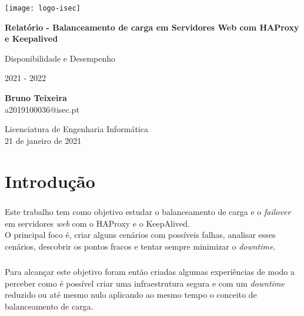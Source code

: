 \documentclass{report}
\begin{document}
	\begin{titlepage}
    	\begin{center}
    		\texttt{[image: logo-isec]}
    		
    		\vspace*{\fill}
    		
    		\Huge
    		\textbf{Relatório - Balanceamento de carga em Servidores Web com HAProxy e Keepalived}
    		
    		\huge
    		Disponibilidade e Desempenho
    		
    		\vspace{0.5cm}
    		\LARGE
    		2021 - 2022
    		
    		\vspace{1.5cm}
    		
    		\textbf{Bruno Teixeira}\\
                a2019100036@isec.pt
    		
    		\vfill
    		\vspace*{\fill}
    		
    		\normalsize
    		Licenciatura de Engenharia Informática \\
    		21 de janeiro de 2021
    	\end{center}
    \end{titlepage}



\tableofcontents
\listoffigures    %



\clearpage
{}


\chapter{Introdução}\label{chap.introducao}
\paragraph{}
Este trabalho tem como objetivo estudar o balanceamento de carga e o \emph{failover} em servidores \emph{web} com o HAProxy e o KeepAlived. \\
O principal foco é, criar alguns cenários com possíveis falhas, analisar esses cenários, descobrir os pontos fracos e tentar sempre minimizar o \emph{downtime}.
\paragraph{}
Para alcançar este objetivo foram então criadas algumas experiências de modo a perceber como é possível criar uma infraestrutura segura e com um \emph{downtime} reduzido ou até mesmo nulo aplicando ao mesmo tempo o conceito de balanceamento de carga.
\label{chap.introducao}
\end{document}
